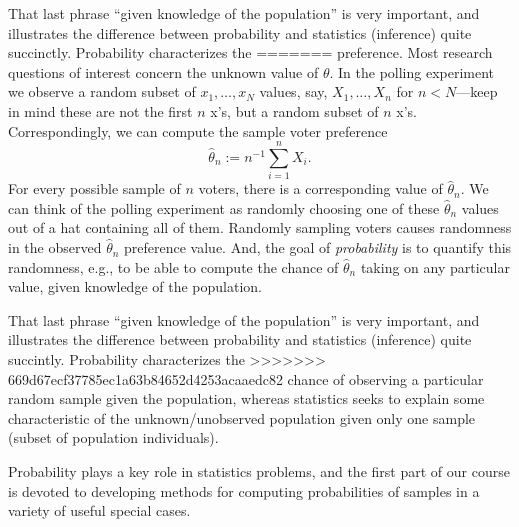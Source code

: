 \documentclass[]{book}
\begin{document}
That last phrase ``given knowledge of the population'' is very
important, and illustrates the difference between probability and
statistics (inference) quite succinctly. Probability characterizes the
=======
preference. Most research questions of interest concern the unknown
value of \(\theta\). In the polling experiment we observe a random
subset of \(x_1, \ldots, x_N\) values, say, \(X_1, \ldots, X_n\) for
\(n<N\)---keep in mind these are not the first \(n\) x's, but a random
subset of \(n\) x's. Correspondingly, we can compute the sample voter
preference \[\hat\theta_n := n^{-1}\sum_{i=1}^n X_i.\] For every
possible sample of \(n\) voters, there is a corresponding value of
\(\hat\theta_n\). We can think of the polling experiment as randomly
choosing one of these \(\hat\theta_n\) values out of a hat containing
all of them. Randomly sampling voters causes randomness in the observed
\(\hat\theta_n\) preference value. And, the goal of \emph{probability}
is to quantify this randomness, e.g., to be able to compute the chance
of \(\hat\theta_n\) taking on any particular value, given knowledge of
the population.

That last phrase ``given knowledge of the population'' is very
important, and illustrates the difference between probability and
statistics (inference) quite succintly. Probability characterizes the
>>>>>>> 669d67ecf37785ec1a63b84652d4253acaaedc82
chance of observing a particular random sample given the population,
whereas statistics seeks to explain some characteristic of the
unknown/unobserved population given only one sample (subset of
population individuals).

Probability plays a key role in statistics problems, and the first part
of our course is devoted to developing methods for computing
probabilities of samples in a variety of useful special cases.
\end{document}

